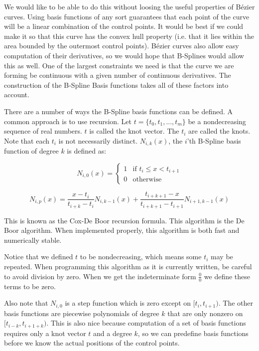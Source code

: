 We would like to be able to do this without loosing the useful properties of B\'{e}zier curves.
Using basis functions of any sort guarantees that each point of the curve will be a linear combination of the control points.
It would be best if we could make it so that this curve has the convex hull property (i.e. that it lies within the area bounded by the outermost control points).
B\'{e}zier curves also allow easy computation of their derivatives, so we would hope that B-Splines would allow this as well.
One of the largest constraints we need is that the curve we are forming be continuous with a given number of continuous derivatives.
The construction of the B-Spline Basis functions takes all of these factors into account.

There are a number of ways the B-Spline basis functions can be defined.
A common approach is to use recursion.
Let $t = \lbrace t_0, t_1, ... , t_m \rbrace$ be a nondecreasing sequence of real numbers.
$t$ is called the knot vector.
The $t_i$ are called the knots.
Note that each $t_i$ is not necessarily distinct.
$N_{i,k}(x)$, the $i$'th B-Spline basis function of degree $k$ is defined as:

\begin{equation}
N_{i,0}(x) =
\begin{cases}
1 & \text{if } t_i \leq x < t_{i+1} \\
0 & \text{otherwise}
\end{cases}
\end{equation}

\begin{equation}
N_{i,p}(x) = \frac{x - t_i}{t_{i+k} - t_i} N_{i,k-1}(x) + \frac{t_{i + k + 1} - x}{t_{i + k + 1} - t_{i + 1}} N_{i+1,k-1}(x)
\end{equation}

This is known as the Cox-De Boor recursion formula.
This algorithm is the De Boor algorithm.
When implemented properly, this algorithm is both fast and numerically stable.

Notice that we defined $t$ to be nondecreasing, which means some $t_i$ may be repeated.
When programming this algorithm as it is currently written, be careful to avoid division by zero.
When we get the indeterminate form $\frac{0}{0}$ we define these terms to be zero.

Also note that $N_{i,0}$ is a step function which is zero except on $[t_i, t_{i+1})$.
The other basis functions are piecewise polynomials of degree $k$ that are only nonzero on $[t_{i-k}, t_{i+1+k})$.
This is also nice because computation of a set of basis functions requires only a knot vector $t$ and a degree $k$, so we can predefine basis functions before we know the actual positions of the control points.

